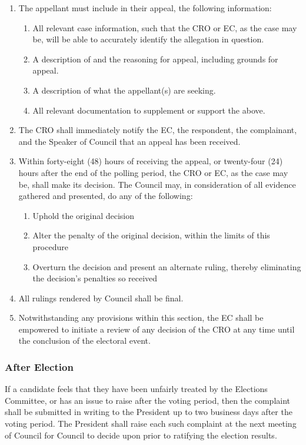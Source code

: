 \begin{enumerate}
			\item The appellant must include in their appeal, the following information:
				\begin{enumerate}
					\item All relevant case information, such that the CRO or EC, as the case may be, will be able to accurately identify the allegation in question.
					\item A description of and the reasoning for appeal, including grounds for appeal.
					\item A description of what the appellant(s) are seeking.
					\item All relevant documentation to supplement or support the above.
				\end{enumerate}
			\item The CRO shall immediately notify the EC, the respondent, the complainant, and the Speaker of Council that an appeal has been received.
			\item Within forty-eight (48) hours of receiving the appeal, or twenty-four (24) hours after the end of the polling period, the CRO or EC, as the case may be, shall make its decision. The Council may, in consideration of all evidence gathered and presented, do any of the following:
				\begin{enumerate}
					\item Uphold the original decision
					\item Alter the penalty of the original decision, within the limits of this procedure
					\item Overturn the decision and present an alternate ruling, thereby eliminating the decision's penalties so received
				\end{enumerate}
			\item All rulings rendered by Council shall be final.
			\item Notwithstanding any provisions within this section, the EC shall be empowered to initiate a review of any decision of the CRO at any time until the conclusion of the electoral event.
		\end{enumerate}

\subsubsection{After Election}
If a candidate feels that they have been unfairly treated by the Elections Committee, or has an issue to raise after the voting period, then the complaint shall be submitted in writing to the President up to two business days after the voting period.
The President shall raise each such complaint at the next meeting of Council for Council to decide upon prior to ratifying the election results.

